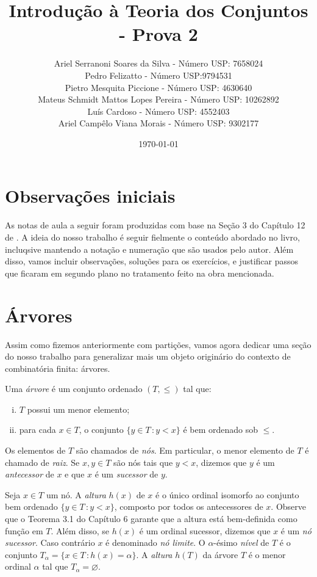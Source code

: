 \documentclass[a4paper]{article}
\title{Introdução à Teoria dos Conjuntos - Prova 2}
\author{Ariel Serranoni Soares da Silva  - Número USP: 7658024\\
Pedro Felizatto - Número USP:9794531\\
Pietro Mesquita Piccione - Número USP: 4630640\\
Mateus Schmidt Mattos Lopes Pereira - Número USP: 10262892\\
Luís Cardoso - Número USP: 4552403\\
Ariel Campêlo Viana Morais - Número USP: 9302177}
\date{\today}
\begin{document}
\maketitle
\section*{Observações iniciais}

As notas de aula a seguir foram produzidas com base na Seção 3 do Capítulo 12 de
\cite{jech}. A ideia do nosso trabalho é seguir fielmente o conteúdo abordado no
livro, incluqsive mantendo a notação e numeração que são usados pelo autor.
Além disso, vamos incluir observações, soluções para os exercícios, e justificar
passos que ficaram em segundo plano no tratamento feito na obra mencionada.

\setcounter{section}{2}
\section{Árvores}

Assim como fizemos anteriormente com partições, vamos agora dedicar uma seção do
nosso trabalho para generalizar mais um objeto originário do
contexto de combinatória finita: árvores.

\begin{definition}
  Uma \emph{árvore} é um conjunto ordenado \((T,\leq)\) tal que:
 \begin{enumerate}[(i)]
  \item \(T\) possui um menor elemento;
  \item para cada \(x\in T\), o conjunto \(\{y\in T\,\colon y<x\}\) é bem
    ordenado sob \(\leq\).
  \end{enumerate}
\end{definition}
Os elementos de \(T\) são chamados de \emph{nós}. Em particular,
o menor elemento de \(T\) é chamado  de \emph{raiz}.
Se \(x,y\in T\) são nós tais que  \(y<x\), dizemos que \(y\) é um
\emph{antecessor} de \(x\) e que \(x\) é um \emph{sucessor} de \(y\).

Seja \(x\in T\) um nó.  A \emph{altura} \(h(x)\) de \(x\) é o único ordinal
isomorfo ao conjunto bem ordenado \mbox{\(\{y\in T\,\colon
y<x\}\),} composto por todos os antecessores de \(x\). Observe que o Teorema 3.1
do Capítulo 6 garante que a altura está bem-definida como função em \(T\).
Além disso, se \(h(x)\) é um ordinal sucessor, dizemos que \(x\) é um
\emph{nó sucessor}. Caso contrário \(x\) é denominado \emph{nó limite}.
O \(\alpha\)-ésimo \emph{nível} de \(T\) é o conjunto
\(T_\alpha=\{x\in T \,\colon h(x)=\alpha\}\). A \emph{altura} \(h(T)\) da árvore
\(T\) é o menor ordinal \(\alpha\) tal que \(T_\alpha=\varnothing\).  
\end{document}
